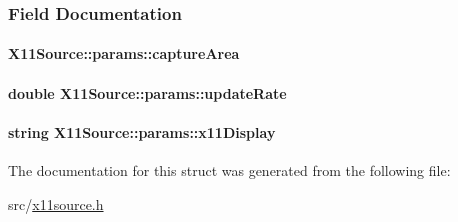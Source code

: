 \subsubsection{\-Field \-Documentation}
\hypertarget{structX11Source_1_1params_adc58aad60a470f9e40ba4a8092e0d9d5}{
\paragraph[{capture\-Area}]{ {\bf \-X11\-Source\-::params\-::capture\-Area}}}\label{structX11Source_1_1params_adc58aad60a470f9e40ba4a8092e0d9d5}
\hypertarget{structX11Source_1_1params_a218cb1cd1a5d80372fcb4bfe0ec1917b}{
\paragraph[{update\-Rate}]{\setlength{\rightskip}{0pt plus 5cm}double {\bf \-X11\-Source\-::params\-::update\-Rate}}}\label{structX11Source_1_1params_a218cb1cd1a5d80372fcb4bfe0ec1917b}
\hypertarget{structX11Source_1_1params_a04dd0457d0564d0a53898ae0d12b3950}{
\paragraph[{x11\-Display}]{\setlength{\rightskip}{0pt plus 5cm}string {\bf \-X11\-Source\-::params\-::x11\-Display}}}\label{structX11Source_1_1params_a04dd0457d0564d0a53898ae0d12b3950}


\-The documentation for this struct was generated from the following file\-:\begin{DoxyCompactItemize}
\item 
src/\hyperlink{x11source_8h}{x11source.\-h}\end{DoxyCompactItemize}
